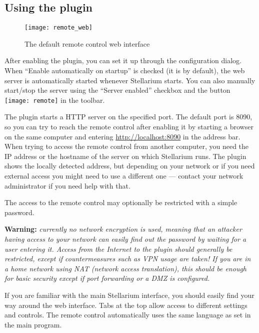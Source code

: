 \subsection{Using the plugin}
\label{sec:plugins:RemoteControl:using}

\begin{figure}[h]
\centering\texttt{[image: remote\_web]}
\caption{The default remote control web interface}
\end{figure}

After enabling the plugin, you can set it up through the configuration dialog. 
When ``Enable automatically on startup'' is checked (it is by default), the web 
server is automatically started whenever Stellarium starts. You can also 
manually start/stop the server using the ``Server enabled'' checkbox and the 
button \texttt{[image: remote]} in the toolbar.

The plugin starts a HTTP server on the specified port. The default port is 
8090, so you can try to reach the remote control after enabling it by starting 
a browser on the same computer and entering \url{http://localhost:8090} in the 
address bar. When trying to access the remote control from another computer, 
you need the IP address or the hostname of the server on which Stellarium runs. 
The plugin shows the locally detected address, but depending on your network or 
if you need external access you might need to use a different one 
--- contact your network administrator if you need help with that.

The access to the remote control may optionally be restricted with a simple 
password.

\textbf{Warning:} \emph{currently no network encryption is used, meaning that 
an attacker having access to your network can easily find out the password by 
waiting for a user entering it. Access from the Internet to the 
plugin should generally be restricted, except if countermeasures such as VPN 
usage are taken! If you are in a home network using NAT (network access 
translation), this should be enough for basic security except if port 
forwarding or a DMZ is configured.}

If you are familiar with the main Stellarium interface, you should easily find 
your way around the web interface. Tabs at the top allow access to 
different settings and controls. The remote control automatically uses the 
same language as set in the main program.

